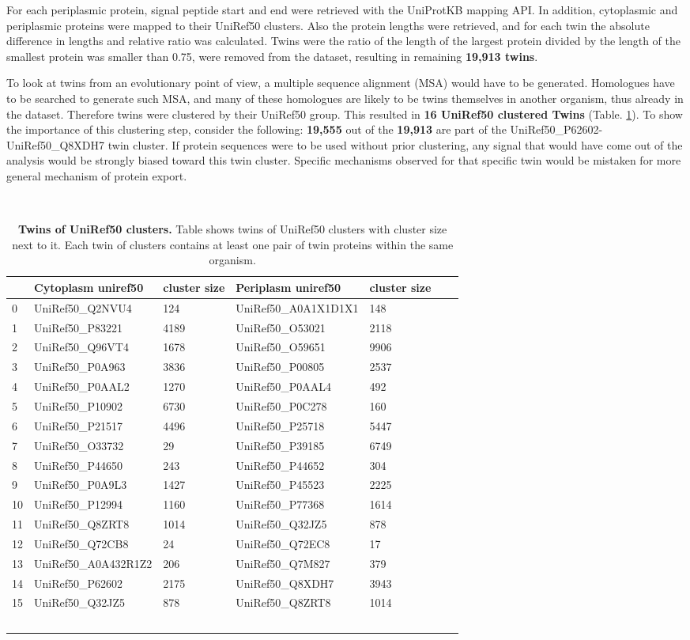 For each periplasmic protein, signal peptide start and end were retrieved with the UniProtKB mapping API.
In addition, cytoplasmic and periplasmic proteins were mapped to their UniRef50 clusters.
Also the protein lengths were retrieved,
and for each twin the absolute difference in lengths and relative ratio was calculated.
Twins were the ratio of the length of the largest protein divided by the length of the smallest protein was smaller than 0.75,
were removed from the dataset, resulting in remaining \textbf{19,913 twins}.

To look at twins from an evolutionary point of view, 
a multiple sequence alignment (MSA) would have to be generated.
Homologues have to be searched to generate such MSA,
and many of these homologues are likely to be twins themselves in another organism, thus already in the dataset.
Therefore twins were clustered by their UniRef50 group.
This resulted in \textbf{16 UniRef50 clustered Twins} (Table. \ref{table:twins}).
To show the importance of this clustering step,
consider the following:
\textbf{19,555} out of the \textbf{19,913} are part of the UniRef50\_P62602-UniRef50\_Q8XDH7 twin cluster.
If protein sequences were to be used without prior clustering,
any signal that would have come out of the analysis would be strongly biased toward this twin cluster.
Specific mechanisms observed for that specific twin would be mistaken for more general mechanism of protein export.

~\begin{longtable}[]{@{}lllllll@{}}
\toprule
& Cytoplasm uniref50 & cluster size & Periplasm uniref50 & cluster size \tabularnewline
\midrule
\endhead
0 & UniRef50\_Q2NVU4 & 124 & UniRef50\_A0A1X1D1X1 & 148 \tabularnewline
1 & UniRef50\_P83221 & 4189 & UniRef50\_O53021 & 2118 \tabularnewline
2 & UniRef50\_Q96VT4 & 1678 & UniRef50\_O59651 & 9906 \tabularnewline
3 & UniRef50\_P0A963 & 3836 & UniRef50\_P00805 & 2537 \tabularnewline
4 & UniRef50\_P0AAL2 & 1270 & UniRef50\_P0AAL4 & 492 \tabularnewline
5 & UniRef50\_P10902 & 6730 & UniRef50\_P0C278 & 160 \tabularnewline
6 & UniRef50\_P21517 & 4496 & UniRef50\_P25718 & 5447 \tabularnewline
7 & UniRef50\_O33732 & 29 & UniRef50\_P39185 & 6749 \tabularnewline
8 & UniRef50\_P44650 & 243 & UniRef50\_P44652 & 304 \tabularnewline
9 & UniRef50\_P0A9L3 & 1427 & UniRef50\_P45523 & 2225 \tabularnewline
10 & UniRef50\_P12994 & 1160 & UniRef50\_P77368 & 1614 \tabularnewline
11 & UniRef50\_Q8ZRT8 & 1014 & UniRef50\_Q32JZ5 & 878 \tabularnewline
12 & UniRef50\_Q72CB8 & 24 & UniRef50\_Q72EC8 & 17 \tabularnewline
13 & UniRef50\_A0A432R1Z2 & 206 & UniRef50\_Q7M827 & 379 \tabularnewline
14 & UniRef50\_P62602 & 2175 & UniRef50\_Q8XDH7 & 3943 \tabularnewline
15 & UniRef50\_Q32JZ5 & 878 & UniRef50\_Q8ZRT8 & 1014 \tabularnewline
\bottomrule
\caption{\textbf{Twins of UniRef50 clusters.}
Table shows twins of UniRef50 clusters with cluster size next to it.
Each twin of clusters contains at least one pair of twin proteins within the same organism.}
\label{table:twins}
~\end{longtable}

